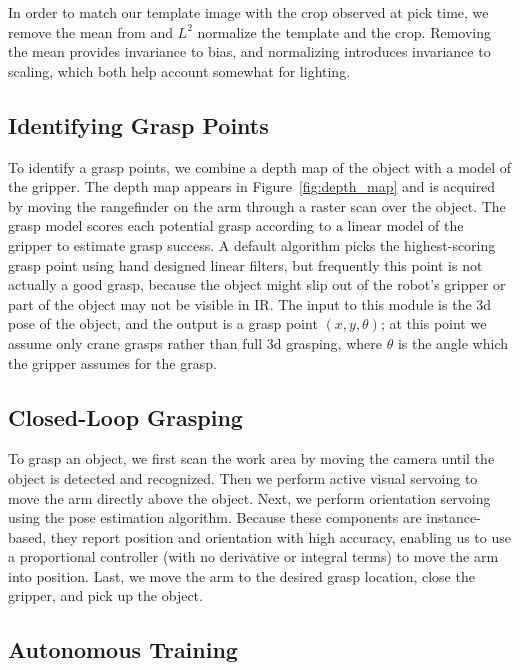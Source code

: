 \documentclass[graybox]{svmult}
\begin{document}
In order to match our template image with the crop observed at pick time,
we remove the mean from and $L^2$ normalize the template and the crop.
Removing the mean provides invariance to bias, and normalizing introduces
invariance to scaling, which both help account somewhat
for lighting. 

\subsection{Identifying Grasp Points}

To identify a grasp points, we combine a depth map of the object with
a model of the gripper.  The depth map appears in
Figure~\ref{fig:depth_map} and is acquired by moving the rangefinder
on the arm through a raster scan over the object.  The grasp model
scores each potential grasp according to a linear model of the gripper
to estimate grasp success. A default algorithm picks the
highest-scoring grasp point using hand designed linear filters, but
frequently this point is not actually a good grasp, because the object
might slip out of the robot's gripper or part of the object may not be
visible in IR.  The input to this module is the 3d pose of the object,
and the output is a grasp point $(x, y, \theta)$; at this point we
assume only crane grasps rather than full 3d grasping, where $\theta$
is the angle which the gripper assumes for the grasp.



\subsection{Closed-Loop Grasping}

To grasp an object, we first scan the work area by moving the camera
until the object is detected and recognized.  Then we perform active
visual servoing to move the arm directly above the object.  Next, we
perform orientation servoing using the pose estimation
algorithm. Because these components are instance-based, they report
position and orientation with high accuracy, enabling us to use a
proportional controller (with no derivative or integral terms) to move
the arm into position.  Last, we move the arm to the desired grasp
location, close the gripper, and pick up the object.


\subsection{Autonomous Training}
\label{sec:training}
\end{document}

